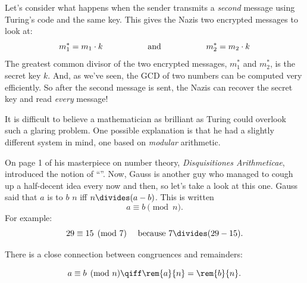 Let's consider what happens when the sender transmits a
\emph{second} message using Turing's code and the same key.  This
gives the Nazis two encrypted messages to look at:
%
\[
m_1^* = m_1 \cdot k
\hspace{0.75in} \text{and} \hspace{0.75in}
m_2^* = m_2 \cdot k
\]
%
The greatest common divisor of the two encrypted messages, $m_1^*$ and
$m_2^*$, is the secret key $k$.  And, as we've seen, the GCD of two
numbers can be computed very efficiently.  So after the second message is
sent, the Nazis can recover the secret key and read \emph{every}
message!

It is difficult to believe a mathematician as brilliant as Turing
could overlook such a glaring problem.  One possible explanation is
that he had a slightly different system in mind, one based on
\emph{modular} arithmetic.



\label{modular_arithmeric_sec}


On page 1 of his masterpiece on number theory, \emph{Disquisitiones
  Arithmeticae},  introduced the notion of
``''.  Now, Gauss is another guy who managed to cough up a
half-decent idea every now and then, so let's take a look at this one.
Gauss said that $a$ is  to $b$  $n$ iff $n
\divides (a - b)$.  This is written 
\[
a \equiv b \pmod{n}.
\]
For example:
%
\[
29 \equiv 15 \pmod{7}  \quad\text{ because }  7 \divides (29 - 15).
\]

There is a close connection between congruences and remainders:
\begin{lemma}
\label{lem:conrem}
\[
a \equiv b \pmod{n} \qiff \rem{a}{n} = \rem{b}{n}.
\]
\end{lemma}

